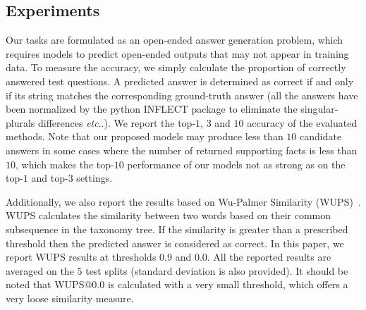 \documentclass[10pt,journal]{IEEEtran}
\makeatletter
\DeclareRobustCommand\onedot{\futurelet\@let@token\@onedot}
\def\@onedot{\ifx\@let@token.\else.\null\fi\xspace}
\def\etc{\emph{etc}\onedot} \def\vs{\emph{vs}\onedot}
\makeatother
\begin{document}
\begin{table}[t!]
\centering
{}
\caption{Question-Query mapping accuracy for different KB sources on the \KBName testing splits. Top-$1$ and Top-$3$ results are reported.}
\label{question_query_map}
\end{table}


\subsection{\KBName Experiments}

Our \KBName tasks are formulated as an open-ended answer generation problem, which requires models to predict open-ended outputs that may not appear in training data. To measure the accuracy, we simply calculate the proportion of correctly answered test questions. A predicted answer is determined as correct if and only if its string matches the corresponding ground-truth answer (all the answers have been normalized by the python INFLECT package to eliminate the singular-plurals differences \etc). We report the top-$1$, $3$ and $10$ accuracy of the evaluated methods. { Note that our proposed models may produce less than $10$ candidate answers in some cases where the number of returned supporting facts is less than $10$, which makes the top-$10$ performance of our models not as strong as on the top-$1$ and top-$3$ settings.}

Additionally, we also report the results based on Wu-Palmer Similarity (WUPS)~\cite{wu1994verbs}. WUPS calculates the similarity between two words based on their common subsequence in the taxonomy tree. If the similarity is greater than a prescribed threshold then the predicted answer is considered as correct. In this paper, we report WUPS results at thresholds $0.9$ and $0.0$. All the reported results are averaged on the $5$ test splits (standard deviation is also provided). {It should be noted that WUPS@$0.0$ is calculated with a very small threshold, which 
	offers a very loose similarity measure.}
\end{document}

